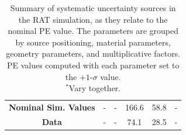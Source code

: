 \documentclass[aps,pra,notitlepage,groupedaddress]{revtex4-1}
\begin{document}
\begin{table}
\begin{center}
\begin{tabular}{| c | c | c | c | c | c |}
			\textbf{Nominal Sim. Values}	&	-	&	-	&	166.6	&	58.8	&	-	\\
			\textbf{Data}	&	-	&	-	&	74.1	&	28.5	&	-	\\
			\hline
		\end{tabular}
		\caption{Summary of systematic uncertainty sources in the RAT simulation, as they relate to the nominal PE value. The parameters are grouped by source positioning, material parameters, geometry parameters, and multiplicative factors. PE values computed with each parameter set to the $+1$-$\sigma$ value. \hfill \\ $^*$Vary together.\label{tab:system}}
	\end{center}
\end{table}


\end{document}
